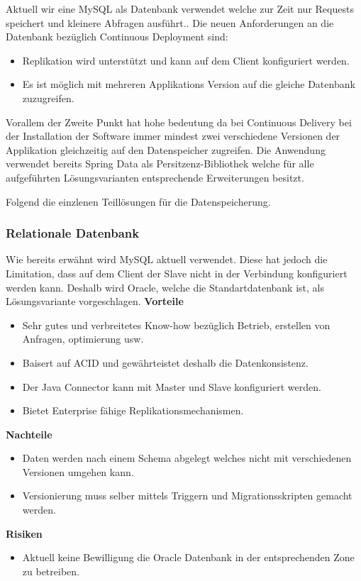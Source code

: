 Aktuell wir eine MySQL als Datenbank verwendet welche zur Zeit nur Requests speichert und kleinere Abfragen ausführt.. Die neuen Anforderungen an die Datenbank bezüglich Continuous Deployment sind:
\begin{itemize}
	\item Replikation wird unterstützt und kann auf dem Client konfiguriert werden.
	\item Es ist möglich mit mehreren Applikations Version auf die gleiche Datenbank zuzugreifen.
\end{itemize}
Vorallem der Zweite Punkt hat hohe bedeutung da bei Continuous Delivery bei der Installation der Software immer mindest zwei verschiedene Versionen der Applikation gleichzeitig auf den Datenspeicher zugreifen. Die Anwendung verwendet bereits Spring Data als Persitzenz-Bibliothek welche für alle aufgeführten Lösungsvarianten entsprechende Erweiterungen besitzt.

Folgend die einzlenen Teillösungen für die Datenspeicherung.

\subsubsection{Relationale Datenbank}

Wie bereits erwähnt wird MySQL aktuell verwendet. Diese hat jedoch die Limitation, dass auf dem Client der Slave nicht in der Verbindung konfiguriert werden kann. Deshalb wird Oracle, welche die Standartdatenbank ist, als Lösungsvariante vorgeschlagen.
\newline
\newline
\textbf{Vorteile}
\begin{itemize}
	\item Sehr gutes und verbreitetes Know-how bezüglich Betrieb, erstellen von Anfragen, optimierung usw.
	\item Baisert auf ACID und gewährteistet deshalb die Datenkonsistenz.
	\item Der Java Connector kann mit Master und Slave konfiguriert werden.
	\item Bietet Enterprise fähige Replikationsmechanismen.
\end{itemize}
\textbf{Nachteile}
\begin{itemize}
	\item Daten werden nach einem Schema abgelegt welches nicht mit verschiedenen Versionen umgehen kann.
	\item Versionierung muss selber mittels Triggern und Migrationsskripten gemacht werden.	
\end{itemize}
\textbf{Risiken}
\begin{itemize}
	\item Aktuell keine Bewilligung die Oracle Datenbank in der entsprechenden Zone zu betreiben.
\end{itemize}

